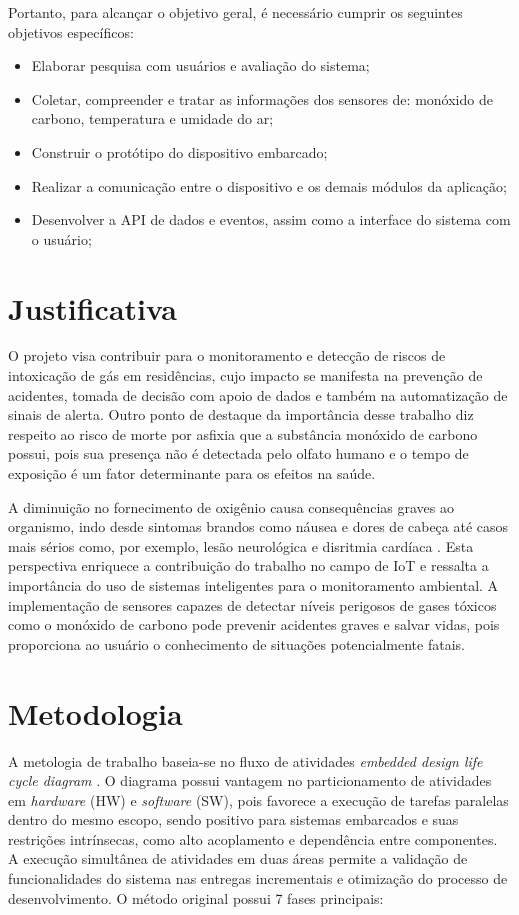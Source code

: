 Portanto, para alcançar o objetivo geral, é necessário cumprir os seguintes objetivos específicos:
\begin{itemize}
    \item Elaborar pesquisa com usuários e avaliação do sistema;
    \item Coletar, compreender e tratar as informações dos sensores de: monóxido de carbono, temperatura e umidade do ar;
    \item Construir o protótipo do dispositivo embarcado;
    \item Realizar a comunicação entre o dispositivo e os demais módulos da aplicação;
    \item Desenvolver a API de dados e eventos, assim como a interface do sistema com o usuário;
\end{itemize}

\section{Justificativa}

O projeto visa contribuir para o monitoramento e detecção de riscos de intoxicação de gás em residências, cujo impacto se manifesta na prevenção de acidentes, tomada de decisão com apoio de dados e também na automatização de sinais de alerta. Outro ponto de destaque da importância desse trabalho diz respeito ao risco de morte por asfixia que a substância monóxido de carbono possui, pois sua presença não é detectada pelo olfato humano e o tempo de exposição é um fator determinante para os efeitos na saúde. 

A diminuição no fornecimento de oxigênio causa consequências graves ao organismo, indo desde sintomas brandos como náusea e dores de cabeça até casos mais sérios como, por exemplo, lesão neurológica e disritmia cardíaca \cite{carbon-monoxide-poisoning-varon}. Esta perspectiva enriquece a contribuição do trabalho no campo de IoT e ressalta a importância do uso de sistemas inteligentes para o monitoramento ambiental. A implementação de sensores capazes de detectar níveis perigosos de gases tóxicos como o monóxido de carbono pode prevenir acidentes graves e salvar vidas, pois proporciona ao usuário o conhecimento de situações potencialmente fatais. 

\section{Metodologia}

A metologia de trabalho baseia-se no fluxo de atividades \textit{embedded design life cycle diagram} \cite{system-design-IOT}. O diagrama possui vantagem no particionamento de atividades em \textit{hardware} (HW) e \textit{software} (SW), pois favorece a execução de tarefas paralelas dentro do mesmo escopo, sendo positivo para sistemas embarcados e suas restrições intrínsecas, como alto acoplamento e dependência entre componentes. A execução simultânea de atividades em duas áreas permite a validação de funcionalidades do sistema nas entregas incrementais e otimização do processo de desenvolvimento. O método original possui 7 fases principais:  

